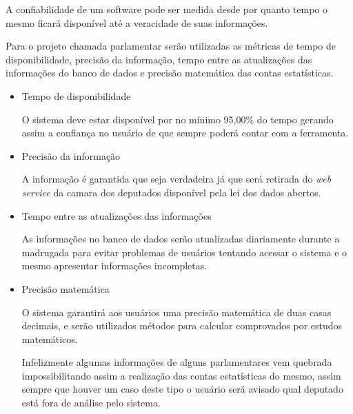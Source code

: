 A confiabilidade de um software pode ser medida desde por quanto tempo o mesmo ficará disponível até a veracidade de suas informações.

Para o projeto chamada parlamentar serão utilizadas as métricas de tempo de disponibilidade, precisão da informação, tempo entre as atualizações das informações do banco de dados e precisão matemática das contas estatísticas.

\begin{itemize} 

	\item{Tempo de disponibilidade}

		O sistema deve estar disponível por no mínimo 95,00\% do tempo gerando assim a confiança no usuário de que sempre poderá contar com a ferramenta.

	\item{Precisão da informação}

		A informação é garantida que seja verdadeira já que será retirada do \textit{web service} da camara dos deputados disponível pela lei dos dados abertos.

	\item{Tempo entre as atualizações das informações}

		As informações no banco de dados serão atualizadas diariamente durante a madrugada para evitar problemas de usuários tentando acessar o sistema e o mesmo apresentar informações incompletas.

	\item{Precisão matemática}

		O sistema garantirá aos usuários uma precisão matemática de duas casas decimais, e serão utilizados métodos para calcular comprovados por estudos matemáticos.

		Infelizmente algumas informações de alguns parlamentares vem quebrada impossibilitando assim a realização das contas estatísticas do mesmo, assim sempre que houver um caso deste tipo o usuário será avisado qual deputado está fora de análise pelo sistema.

\end{itemize}
